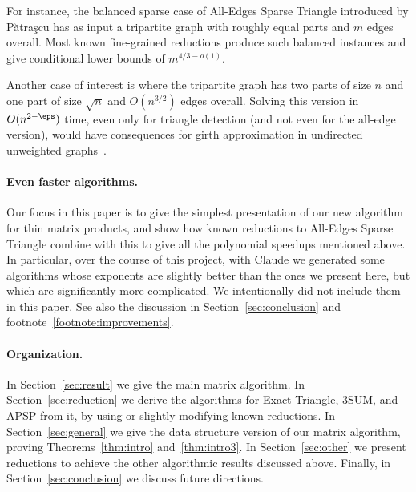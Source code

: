 For instance, 
the balanced sparse case of All-Edges Sparse Triangle introduced by P{\u a}tra{\c s}cu \cite{Pat10} has as input a tripartite graph with roughly equal parts and $m$ edges overall. Most known fine-grained reductions produce such balanced instances and give conditional lower bounds of $m^{4/3-o(1)}$.

Another case of interest is where the tripartite graph has two parts of size $n$ and one part of size $\sqrt n$ and $O(n^{3/2})$ edges overall. Solving this version in $O(n^{2-\eps})$ time, even only for triangle detection (and not even for the all-edge version), would have consequences for girth approximation in undirected unweighted graphs~\cite{RV12}.

\paragraph{Even faster algorithms.}
Our focus in this paper is to give the simplest presentation of our new algorithm for thin matrix products, and show how known reductions to All-Edges Sparse Triangle combine with this to give all the polynomial speedups mentioned above. In particular, over the course of this project, with Claude we generated some algorithms whose exponents are slightly better than the ones we present here, but which are significantly more complicated. We intentionally did not include them in this paper. See also the discussion in Section~\ref{sec:conclusion} and footnote~\ref{footnote:improvements}.

\paragraph{Organization.}
In Section~\ref{sec:result} we give the main matrix algorithm. In Section~\ref{sec:reduction} we derive the algorithms for Exact Triangle, $3$SUM, and APSP from it, by using or slightly modifying known reductions. In Section~\ref{sec:general} we give the data structure version of our matrix algorithm, proving Theorems~\ref{thm:intro} and~\ref{thm:intro3}. In Section~\ref{sec:other} we present reductions to achieve the other algorithmic results discussed above. Finally, in Section~\ref{sec:conclusion} we discuss future directions.
